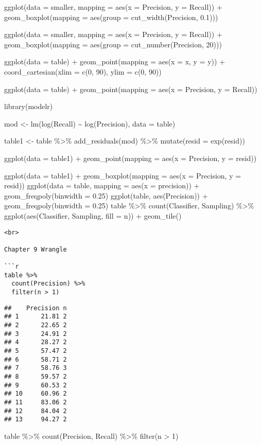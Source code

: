 \documentclass[
]{article}
\newenvironment{Shaded}{\begin{snugshade}}{\end{snugshade}}
\newcommand{\DecValTok}[1]{\textcolor[rgb]{0.00,0.00,0.81}{#1}}
\newcommand{\FunctionTok}[1]{\textcolor[rgb]{0.00,0.00,0.00}{#1}}
\newcommand{\NormalTok}[1]{#1}
\newcommand{\SpecialCharTok}[1]{\textcolor[rgb]{0.00,0.00,0.00}{#1}}
\begin{document}
ggplot(data = smaller, mapping = aes(x = Precision, y = Recall)) +
geom\_boxplot(mapping = aes(group = cut\_width(Precision, 0.1)))

ggplot(data = smaller, mapping = aes(x = Precision, y = Recall)) +
geom\_boxplot(mapping = aes(group = cut\_number(Precision, 20)))

ggplot(data = table) + geom\_point(mapping = aes(x = x, y = y)) +
coord\_cartesian(xlim = c(0, 90), ylim = c(0, 90))

ggplot(data = table) + geom\_point(mapping = aes(x = Precision, y =
Recall))

library(modelr)

mod \textless- lm(log(Recall) \textasciitilde{} log(Precision), data =
table)

table1 \textless- table \%\textgreater\% add\_residuals(mod)
\%\textgreater\% mutate(resid = exp(resid))

ggplot(data = table1) + geom\_point(mapping = aes(x = Precision, y =
resid))

ggplot(data = table1) + geom\_boxplot(mapping = aes(x = Precision, y =
resid)) ggplot(data = table, mapping = aes(x = precision)) +
geom\_freqpoly(binwidth = 0.25) ggplot(table, aes(Precision)) +
geom\_freqpoly(binwidth = 0.25) table \%\textgreater\% count(Classifier,
Sampling) \%\textgreater\% ggplot(aes(Classifier, Sampling, fill = n)) +
geom\_tile()

\begin{verbatim}
<br>

Chapter 9 Wrangle

```r
table %>% 
  count(Precision) %>% 
  filter(n > 1)
\end{verbatim}

\begin{verbatim}
##    Precision n
## 1      21.81 2
## 2      22.65 2
## 3      24.91 2
## 4      28.27 2
## 5      57.47 2
## 6      58.71 2
## 7      58.76 3
## 8      59.57 2
## 9      60.53 2
## 10     60.96 2
## 11     83.06 2
## 12     84.04 2
## 13     94.27 2
\end{verbatim}

\begin{Shaded}
\begin{Highlighting}[]
\NormalTok{table }\SpecialCharTok{\%\textgreater{}\%} 
  \FunctionTok{count}\NormalTok{(Precision, Recall) }\SpecialCharTok{\%\textgreater{}\%} 
  \FunctionTok{filter}\NormalTok{(n }\SpecialCharTok{\textgreater{}} \DecValTok{1}\NormalTok{)}
\end{Highlighting}
\end{Shaded}
\end{document}
